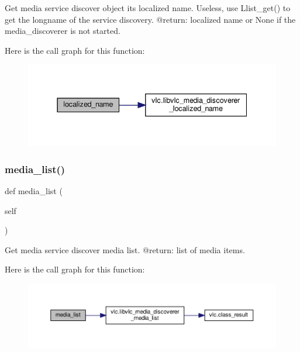 \begin{DoxyVerb}Get media service discover object its localized name.
\deprecated Useless, use L{list_get}() to get the
longname of the service discovery.
@return: localized name or None if the media_discoverer is not started.
\end{DoxyVerb}
 Here is the call graph for this function\+:
\nopagebreak
\begin{figure}[H]
\begin{center}
\leavevmode
\includegraphics[width=337pt]{classvlc_1_1_media_discoverer_a5ac963c487dc1a0a02e21863b0b957c9_cgraph}
\end{center}
\end{figure}
\mbox{\label{classvlc_1_1_media_discoverer_a34194a0d394238d8794d182b65953952}} 
\subsubsection{\texorpdfstring{media\+\_\+list()}{media\_list()}}
{\footnotesize\ttfamily def media\+\_\+list (\begin{DoxyParamCaption}\item[{}]{self }\end{DoxyParamCaption})}

\begin{DoxyVerb}Get media service discover media list.
@return: list of media items.
\end{DoxyVerb}
 Here is the call graph for this function\+:
\nopagebreak
\begin{figure}[H]
\begin{center}
\leavevmode
\includegraphics[width=350pt]{classvlc_1_1_media_discoverer_a34194a0d394238d8794d182b65953952_cgraph}
\end{center}
\end{figure}
\mbox{\label{classvlc_1_1_media_discoverer_a4cd51e19135e5ad4a19eae3ea9c60537}} 
